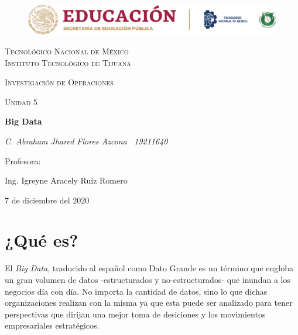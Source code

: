 \documentclass[letterpaper, 12pt]{article}
\begin{document}
    
    \begin{titlepage}
        \begin{figure}[ht]
            \centering
            \includegraphics[width=15cm]{logosITT.png}
        \end{figure}
        \centering
        {\scshape\LARGE Tecnológico Nacional de México\\Instituto Tecnológico de Tijuana\par}
        \vspace{1cm}
        {\scshape\Large Investigación de Operaciones\par}
        \vspace{1cm}
        {\scshape\Large Unidad 5\par}
        \vspace{1.5cm}
        {\huge\bfseries Big Data\par}
        \vspace{2cm}
        {\Large\itshape C. Abraham Jhared Flores Azcona \, 19211640\par}
        \vfill
        Profesora: \par
        Ing. Igreyne Aracely Ruiz Romero
        
        \vfill

        {\large 7 de diciembre del 2020}
    \end{titlepage}

    \newpage
    \section*{¿Qué es?}
    \justify
    El \emph{Big Data}, traducido al español como Dato Grande es un término que engloba un gran volumen de datos -estructurados y no-estructurados- que inundan a los
    negocios día con día. No importa la cantidad de datos, sino lo que dichas organizaciones realizan con la misma ya que esta puede ser analizado para tener perspectivas que
    dirijan una mejor toma de desiciones y los movimientos empresariales estratégicos.
\end{document}
